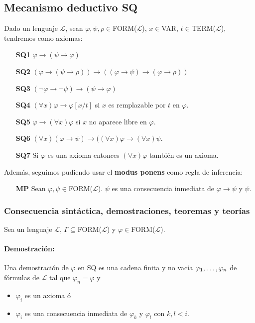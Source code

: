 \subsection{Mecanismo deductivo SQ}
Dado un lenguaje $\mathcal{L}$, sean $\varphi,\psi,\rho\in$FORM($\mathcal{L}$), $x\in$VAR, $t\in$TERM($\mathcal{L}$), tendremos como axiomas:

\begin{itemize}
	\item[\textbf{SQ1}] $\varphi\to(\psi\to\varphi)$
	\item[\textbf{SQ2}] $(\varphi\to(\psi\to\rho))\to((\varphi\to\psi)\to(\varphi\to\rho))$
	\item[\textbf{SQ3}] $(\lnot\varphi\to\lnot\psi)\to(\psi\to\varphi)$
	\item[\textbf{SQ4}] $(\forall x)\varphi\to\varphi[x/t]$ si $x$ es remplazable por $t$ en $\varphi$.
	\item[\textbf{SQ5}] $\varphi\to(\forall x)\varphi$ si $x$ no aparece libre en $\varphi$.
	\item[\textbf{SQ6}] $(\forall x)(\varphi\to\psi)\to((\forall x)\varphi \to(\forall x)\psi$.
	\item[\textbf{SQ7}] Si $\varphi$ es una axioma entonces $(\forall x)\varphi$ también es un axioma.
\end{itemize}

Además, seguimos pudiendo usar el \textbf{modus ponens} como regla de inferencia:
\begin{itemize}
	\item[\textbf{MP}] Sean $\varphi,\psi\in$FORM($\mathcal{L}$). $\psi$ es una consecuencia inmediata de $\varphi\to\psi$ y $\psi$.
\end{itemize}

\subsubsection{Consecuencia sintáctica, demostraciones, teoremas y teorías}
Sea un lenguaje $\mathcal{L}$, $\Gamma\subseteq$FORM($\mathcal{L}$) y $\varphi\in$FORM($\mathcal{L}$).
\paragraph{Demostración:} Una demostración de $\varphi$ en SQ es una cadena finita y no vacía $\varphi_1,\dots, \varphi_{n}$ de fórmulas de $\mathcal{L}$ tal que $\varphi_n = \varphi$ y
\begin{itemize}
	\item $\varphi_i$ es un axioma ó
	\item $\varphi_i$ es una consecuencia inmediata de $\varphi_k$ y $\varphi_l$ con $k,l < i$.
\end{itemize}

